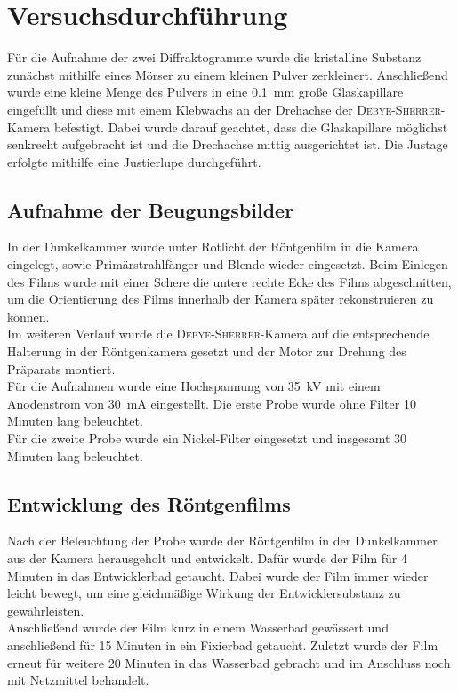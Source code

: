 \documentclass[a4paper,twoside,final]{article}
\begin{document}
\section{Versuchsdurchführung} \label{sec:Versuchsdurchführung}
Für die Aufnahme der zwei Diffraktogramme wurde die kristalline Substanz zunächst mithilfe eines Mörser zu einem kleinen Pulver zerkleinert. Anschließend wurde eine kleine Menge des Pulvers in eine \SI{0.1}{\milli\metre} große Glaskapillare eingefüllt und diese mit einem Klebwachs an der Drehachse der \textsc{Debye\--Sherrer}\--Kamera befestigt. Dabei wurde darauf geachtet, dass die Glaskapillare möglichst senkrecht aufgebracht ist und die Drechachse mittig ausgerichtet ist. Die Justage erfolgte mithilfe eine Justierlupe durchgeführt.
\subsection{Aufnahme der Beugungsbilder}
In der Dunkelkammer wurde unter Rotlicht der Röntgenfilm in die Kamera eingelegt, sowie Primärstrahlfänger und Blende wieder eingesetzt. Beim Einlegen des Films wurde mit einer Schere die untere rechte Ecke des Films abgeschnitten, um die Orientierung des Films innerhalb der Kamera später rekonstruieren zu können.\\
Im weiteren Verlauf wurde die \textsc{Debye\--Sherrer}\--Kamera auf die entsprechende Halterung in der Röntgenkamera gesetzt und der Motor zur Drehung des Präparats montiert.\\
Für die Aufnahmen wurde eine Hochspannung von \SI{35}{\kilo\volt} mit einem Anodenstrom von \SI{30}{\milli\ampere} eingestellt. Die erste Probe wurde ohne Filter 10 Minuten lang beleuchtet.\\
Für die zweite Probe wurde ein Nickel-Filter eingesetzt und insgesamt 30 Minuten lang beleuchtet.
\subsection{Entwicklung des Röntgenfilms}
Nach der Beleuchtung der Probe wurde der Röntgenfilm in der Dunkelkammer aus der Kamera herausgeholt und entwickelt. Dafür wurde der Film für 4 Minuten in das Entwicklerbad getaucht. Dabei wurde der Film immer wieder leicht bewegt, um eine gleichmäßige Wirkung der Entwicklersubstanz zu gewährleisten.\\
Anschließend wurde der Film kurz in einem Wasserbad gewässert und anschließend für 15 Minuten in ein Fixierbad getaucht. Zuletzt wurde der Film erneut für weitere 20 Minuten in das Wasserbad gebracht und im Anschluss noch mit Netzmittel behandelt.
\end{document}

